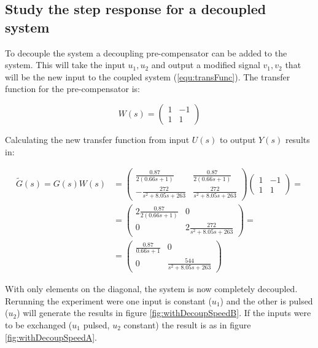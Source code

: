 \documentclass[a4paper, titlepage]{article}
\begin{document}
\subsection{Study the step response for a decoupled system}
To decouple the system a decoupling pre-compensator can be added to the system.
This will take the input $u_1, u_2$ and output a modified signal $v_1, v_2$ that will be the new input to the coupled system (\ref{equ:transFunc}).
The transfer function for the pre-compensator is:

\begin{equation}
W(s) = 
\begin{pmatrix}
1 & -1 \\ 1 & 1
\end{pmatrix}
\end{equation}

Calculating the new transfer function from input $U(s)$ to output $Y(s)$ results in:

\begin{equation}
\begin{split}
\tilde{G}(s) = G(s)W(s) &= 
\begin{pmatrix}
\frac{0.87}{2(0.66s + 1)} & \frac{0.87}{2(0.66s + 1)} \\[6pt]
-\frac{272}{s^2 + 8.05s + 263} & \frac{272}{s^2 + 8.05s + 263}
\end{pmatrix}
\begin{pmatrix}
1 & -1 \\ 1 & 1
\end{pmatrix} = \\
&= \begin{pmatrix}
2\frac{0.87}{2(0.66s + 1)} & 0 \\[6pt]
0 & 2\frac{272}{s^2 + 8.05s + 263}
\end{pmatrix} = \\
&= \begin{pmatrix}
\frac{0.87}{0.66s + 1} & 0 \\[6pt]
0 & \frac{544}{s^2 + 8.05s + 263}
\end{pmatrix}
\end{split}
\label{equ:decoupled}
\end{equation}

With only elements on the diagonal, the system is now completely decoupled.
Rerunning the experiment were one input is constant ($u_1$) and the other is pulsed ($u_2$) will generate the results in figure \ref{fig:withDecoupSpeedB}.
If the inputs were to be exchanged ($u_1$ pulsed, $u_2$ constant) the result is as in figure \ref{fig:withDecoupSpeedA}.
\end{document}
